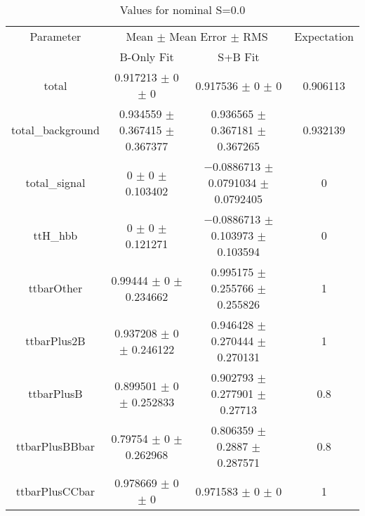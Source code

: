 \begin{table}
\centering
\caption{Values for nominal S=0.0}
\begin{tabular}{cccc}
\toprule
Parameter & \multicolumn{2}{c}{Mean $\pm$ Mean Error $\pm$ RMS} & Expectation\\
 & B-Only Fit & S+B Fit & \\
\midrule
total & \num{0.917213} $\pm$ \num{0} $\pm$ \num{0} & \num{0.917536} $\pm$ \num{0} $\pm$ \num{0} & \num{0.906113}\\
total\_background & \num{0.934559} $\pm$ \num{0.367415} $\pm$ \num{0.367377} & \num{0.936565} $\pm$ \num{0.367181} $\pm$ \num{0.367265} & \num{0.932139}\\
total\_signal & \num{0} $\pm$ \num{0} $\pm$ \num{0.103402} & \num{-0.0886713} $\pm$ \num{0.0791034} $\pm$ \num{0.0792405} & \num{0}\\
ttH\_hbb & \num{0} $\pm$ \num{0} $\pm$ \num{0.121271} & \num{-0.0886713} $\pm$ \num{0.103973} $\pm$ \num{0.103594} & \num{0}\\
ttbarOther & \num{0.99444} $\pm$ \num{0} $\pm$ \num{0.234662} & \num{0.995175} $\pm$ \num{0.255766} $\pm$ \num{0.255826} & \num{1}\\
ttbarPlus2B & \num{0.937208} $\pm$ \num{0} $\pm$ \num{0.246122} & \num{0.946428} $\pm$ \num{0.270444} $\pm$ \num{0.270131} & \num{1}\\
ttbarPlusB & \num{0.899501} $\pm$ \num{0} $\pm$ \num{0.252833} & \num{0.902793} $\pm$ \num{0.277901} $\pm$ \num{0.27713} & \num{0.8}\\
ttbarPlusBBbar & \num{0.79754} $\pm$ \num{0} $\pm$ \num{0.262968} & \num{0.806359} $\pm$ \num{0.2887} $\pm$ \num{0.287571} & \num{0.8}\\
ttbarPlusCCbar & \num{0.978669} $\pm$ \num{0} $\pm$ \num{0} & \num{0.971583} $\pm$ \num{0} $\pm$ \num{0} & \num{1}\\
\bottomrule
\end{tabular}
\end{table}